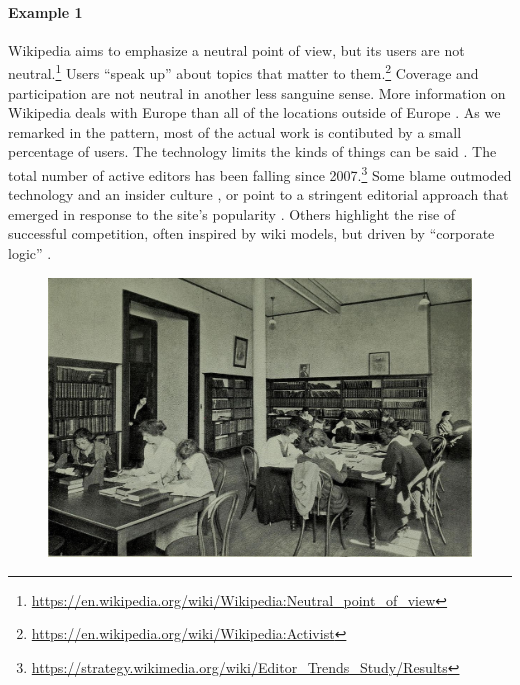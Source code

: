 \begin{refsection}


\paragraph{Example 1}
Wikipedia aims to emphasize a neutral point of view, but its users are
not neutral.\footnote{\url{https://en.wikipedia.org/wiki/Wikipedia:Neutral_point_of_view}}
Users ``speak up'' about topics that matter to them.\footnote{\url{https://en.wikipedia.org/wiki/Wikipedia:Activist}}
Coverage and participation are not neutral in another less sanguine sense.
More information on Wikipedia deals with Europe than
all of the locations outside of Europe \cite{graham2014uneven}.
As we remarked in the  pattern, most of the
actual work is contibuted by a small percentage of users.
%
The technology limits the kinds of things can be said \cite{graham2014uneven}. 
%
The total number of active editors has been falling since
2007.\footnote{\url{https://strategy.wikimedia.org/wiki/Editor_Trends_Study/Results}}
Some blame outmoded technology and an insider culture
\cite{simonite2013decline}, or point to a stringent editorial
approach that emerged in response to the site's popularity
\cite{halfaker13rise}.  Others highlight the rise of successful competition, often inspired by wiki models, but driven by ``corporate logic'' \cite{kreiss2011limits,morellintroductory}.

\begin{figure}
{\centering
\includegraphics[width=.6\textwidth,angle=-90,trim=0 0 10 10, clip=true]{../pictures/ladies-hall.jpg}

}
\end{figure}
\end{refsection}
